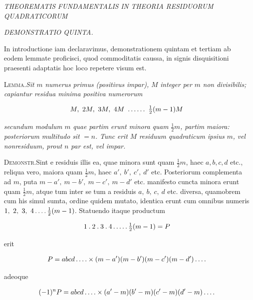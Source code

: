 %
\begin{center}
\textit{THEOREMATIS FUNDAMENTALIS IN THEORIA RESIDUORUM QUADRATICORUM}\par
\textit{DEMONSTRATIO QUINTA.}
\end{center}


In introductione iam declaravimus, demonstrationem quintam et tertiam ab eodem lemmate proficisci, quod commoditatis caussa, in signis disquisitioni praesenti adaptatis hoc loco repetere visum est.

\textsc{Lemma.}\quad \textit{Sit $m$ numerus primus (positivus impar), $M$ integer per $m$ non divi}\textit{sibilis; capiantur residua minima positiva numerorum}

\[
\begin{aligned}
M,\ 2M,\ 3M,\ 4M\ \mathinner{.\,.\,.\,.\,.\,.}\ \tfrac12(m-1)M
\end{aligned}
\]

\textit{secundum modulum $m$ quae partim erunt minora quam $\tfrac12m$, partim maiora: poste}\textit{riorum multitudo sit $=n$. Tunc erit $M$ residuum quadraticum ipsius $m$, vel non}\textit{residuum, prout $n$ par est, vel impar.}

\textsc{Demonstr.}\quad Sint e residuis illis ea, quae minora sunt quam $\tfrac12m$, haec $a,b,c,d$ etc., reliqua vero, maiora quam $\tfrac12m$, haec $a',\ b',\ c',\ d'$ etc. Posteriorum complementa ad $m$, puta $m-a',\ m-b',\ m-c',\ m-d'$ etc. manifesto cuncta minora erunt quam $\tfrac12m$, atque tum inter se tum a residuis $a,\ b,\ c,\ d$ etc. diversa, quamobrem cum his simul sumta, ordine quidem mutato, identica erunt cum omnibus numeris $1,\ 2,\ 3,\ 4\dotsfour\tfrac12(m-1)$. Statuendo itaque productum

\[
\begin{aligned}
1\mathbin{.}2\mathbin{.}3\mathbin{.}4\mathinner{.\,.\,.\,.\,.}\tfrac12(m-1)=P
\end{aligned}
\]

erit

\[
\begin{aligned}
P=abcd\mathinner{.\,.\,.\,.}\times(m-a')(m-b')(m-c')(m-d')\mathinner{.\,.\,.\,.}
\end{aligned}
\]

adeoque

\[
\begin{aligned}
(-1)^nP=abcd\mathinner{.\,.\,.\,.}\times(a'-m)(b'-m)(c'-m)(d'-m)\mathinner{.\,.\,.\,.}
\end{aligned}
\]

